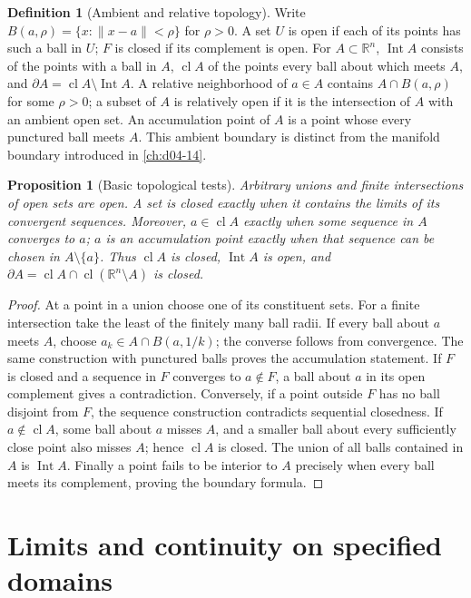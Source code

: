 \documentclass[11pt,oneside,openany]{book}
\newtheorem{proposition}[theorem]{Proposition}
\theoremstyle{definition}
\newtheorem{definition}[theorem]{Definition}
\theoremstyle{remark}
\newcommand{\R}{\mathbb R}
\newcommand{\norm}[1]{\lVert#1\rVert}
\DeclareMathOperator{\Int}{Int}
\DeclareMathOperator{\cl}{cl}
\newcommand{\family}[1]{}
\begin{document}
\begin{definition}[Ambient and relative topology]\label{d04:01:topology}
Write $B(a,\rho)=\{x:\norm{x-a}<\rho\}$ for $\rho>0$.
A set $U$ is open if each of its points has such a ball in $U$; $F$ is closed
if its complement is open. For $A\subset\R^n$, $\Int A$ consists of the
points with a ball in $A$, $\cl A$ of the points every ball about which meets
$A$, and $\partial A=\cl A\setminus\Int A$. A relative neighborhood of
$a\in A$ contains $A\cap B(a,\rho)$ for some $\rho>0$; a subset of $A$
is relatively open if it is the intersection of $A$ with an ambient open set.
An accumulation point of $A$ is a point whose every punctured ball meets $A$.
This ambient boundary is distinct from the manifold boundary introduced in
\cref{ch:d04-14}.
\end{definition}

\begin{proposition}[Basic topological tests]\label{d04:01:closure-tests}
Arbitrary unions and finite intersections of open sets are open. A set is
closed exactly when it contains the limits of its convergent sequences.
Moreover, $a\in\cl A$ exactly when some sequence in $A$ converges to $a$;
$a$ is an accumulation point exactly when that sequence can be chosen in
$A\setminus\{a\}$. Thus $\cl A$ is closed, $\Int A$ is open, and
$\partial A=\cl A\cap\cl(\R^n\setminus A)$ is closed.
\end{proposition}
\begin{proof}
At a point in a union choose one of its constituent sets. For a finite
intersection take the least of the finitely many ball radii. If every ball
about $a$ meets $A$, choose $a_k\in A\cap B(a,1/k)$; the converse follows
from convergence. The same construction with punctured balls proves the
accumulation statement. If $F$ is closed and a sequence in $F$ converges to
$a\notin F$, a ball about $a$ in its open complement gives a contradiction.
Conversely, if a point outside $F$ has no ball disjoint from $F$, the sequence
construction contradicts sequential closedness. If $a\notin\cl A$, some ball
about $a$ misses $A$, and a smaller ball about every sufficiently close point
also misses $A$; hence $\cl A$ is closed. The union of all balls contained
in $A$ is $\Int A$. Finally a point fails to be interior to $A$ precisely
when every ball meets its complement, proving the boundary formula.
\end{proof}

\section{Limits and continuity on specified domains}
\family{K04.01.04}\family{K04.01.05}
\end{document}
